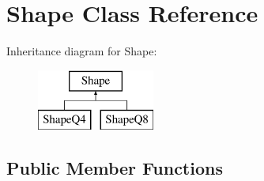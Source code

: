 \hypertarget{class_shape}{}\section{Shape Class Reference}
\label{class_shape}
Inheritance diagram for Shape\+:\begin{figure}[H]
\begin{center}
\leavevmode
\includegraphics[height=2.000000cm]{class_shape}
\end{center}
\end{figure}
\subsection*{Public Member Functions}
